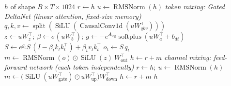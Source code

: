 \documentclass[10pt,a4paper]{article}
\newcommand{\op}[1]{\operatorname{#1}}
\theoremstyle{definition}
\begin{document}
\begin{algorithm}[H]
\caption{Block $\mathcal{B}_{\mathrm{L}}(h)$ --- Linear-attention (Gated DeltaNet) block}
\begin{algorithmic}[1]
\Require $h$ of shape $B\times T\times 1024$
\State $r \gets h$ 
\State $u \gets \op{RMSNorm}(h)$ 
\Statex \hspace{-1.2em}\textit{token mixing: Gated DeltaNet (linear attention, fixed-size memory)}
\State $q,k,v \gets \op{split}(\op{SiLU}(\op{CausalConv1d}(u W_{qkv}^{\top})))$ 
\State $z \gets u W_z^{\top};\ \beta \gets \sigma(u W_b^{\top});\ g \gets -e^{A_{\log}}\op{softplus}(u W_a^{\top}+b_{dt})$ 
 
\State $S \gets e^{g_t} S\,(I-\beta_t k_t k_t^{\top}) + \beta_t v_t k_t^{\top}$ 
\State $o_t \gets S\, q_t$ 
\EndFor
\State $m \gets \op{RMSNorm}(o)\odot \op{SiLU}(z)\ W_{\mathrm{out}}^{\top}$ 
\State $h \gets r + m$ 
\Statex \hspace{-1.2em}\textit{channel mixing: feed-forward network (each token independently)}
\State $r \gets h;\ u \gets \op{RMSNorm}(h)$
\State $m \gets \big(\op{SiLU}(u W_{\mathrm{gate}}^{\top}) \odot u W_{\mathrm{up}}^{\top}\big) W_{\mathrm{down}}^{\top}$ 
\State $h \gets r + m$ 
\State \Return $h$
\end{algorithmic}
\end{algorithm}
\end{document}
